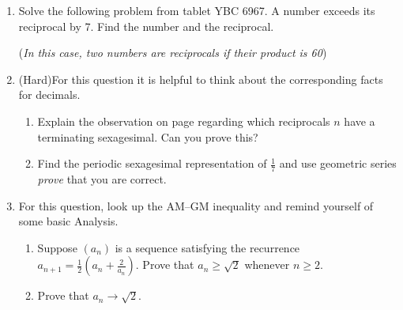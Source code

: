 \begin{exercises*}{}{}
\begin{enumerate}
	  
	  \item%
	  Solve the following problem from tablet YBC 6967. A number exceeds its reciprocal by 7. Find the number and the reciprocal.\par
	  (\emph{In this case, two numbers are reciprocals if their product is 60})
	
	
	  \item (Hard)\lstsp For this question it is helpful to think about the corresponding facts for decimals.
	  \begin{enumerate}
	    \item Explain the observation on page \pageref{babfraction} regarding which reciprocals $n$ have a terminating sexagesimal. Can you prove this?
	  	\item Find the periodic sexagesimal representation of $\frac 17$ and use geometric series \emph{prove} that you are correct.
	  \end{enumerate}  
	  
	  
	  \item\label{exs:methodmean}
	  For this question, look up the AM--GM inequality and remind yourself of some basic Analysis.
	  \begin{enumerate}
			\item Suppose $(a_n)$ is a sequence satisfying the recurrence $a_{n+1}=\frac 12(a_n+\frac 2{a_n})$. Prove that $a_n\ge \sqrt 2$ whenever $n\ge 2$.
			\item Prove that $a_n\to\sqrt 2$.
		\end{enumerate}
	\end{enumerate}
\end{exercises*}

% 
